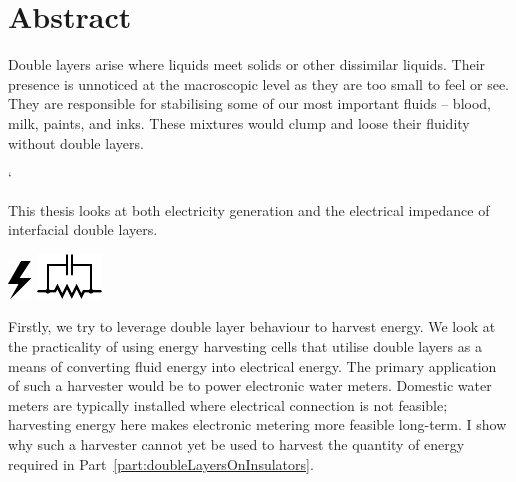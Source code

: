 





\rmfamily

\chapter*{Abstract}
  Double layers arise where liquids meet solids or other dissimilar liquids.
  Their presence is unnoticed at the macroscopic level as they are too small to feel or see.
  They are responsible for stabilising some of our most important fluids -- blood, milk, paints, and inks.
  These mixtures would clump and loose their fluidity without double layers.

  \vspace{-0.3cm}
  \begin{center}
    \parbox{8.8cm}{
     ` \begin{center}
        This thesis looks at both electricity generation and the electrical impedance of interfacial double layers.
      \end{center}
      \vspace{-1.35cm}
    }
    \vspace{-0.3cm}
    \parbox{15cm}{
        \hspace{0.8cm}
        \hbox{\vspace{-0.9cm}\includegraphics{graphics/logo_electricity}}
        \hbox{\hspace{9.8cm}\includegraphics{graphics/logo_impedance}}
    }
  \end{center}
  \vspace{0.5cm}

  Firstly, we try to leverage double layer behaviour to harvest energy.
  We look at the practicality of using energy harvesting cells that utilise double layers as a means of converting fluid energy into electrical energy.
  The primary application of such a harvester would be to power electronic water meters.
  Domestic water meters are typically installed where electrical connection is not feasible; harvesting energy here makes electronic metering more feasible long-term.
  I show why such a harvester cannot yet be used to harvest the quantity of energy required in Part~\ref{part:doubleLayersOnInsulators}.

